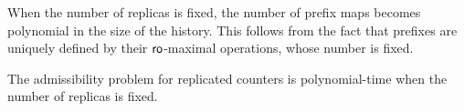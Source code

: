 When the number of replicas is fixed, the number of prefix maps becomes polynomial in the size of the history. This follows from the fact that prefixes are uniquely defined by their $\mathsf{ro}$-maximal operations, whose number is fixed.

\vspace{-2mm}
\begin{corollary}

  The admissibility problem for replicated counters is polynomial-time when the number of replicas is fixed.

\vspace{-2mm}
\end{corollary}


